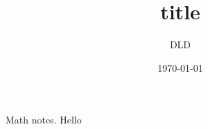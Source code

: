 \documentclass[11pt,reqno]{amsart}
\title{title}
\author{DLD}
\date{\today}
\theoremstyle{plain}
\theoremstyle{definition}
\begin{document}
\maketitle

Math notes. Hello

\vspace{20 mm}


\end{document}
